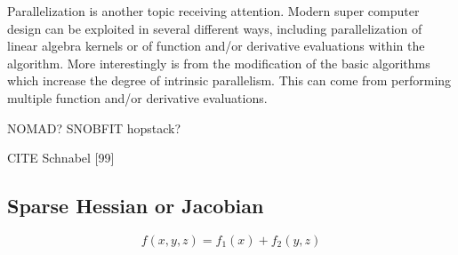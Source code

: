 \documentclass{article}
\begin{document}
Parallelization is another topic receiving attention.
Modern super computer design can be exploited in several different ways, including parallelization of linear algebra kernels or of function and/or derivative evaluations within the algorithm.
More interestingly is from the modification of the basic algorithms which increase the degree of intrinsic parallelism.
This can come from performing multiple function and/or derivative evaluations.


NOMAD?
SNOBFIT
hopstack?

CITE
Schnabel [99]




\subsection{Sparse Hessian or Jacobian}


\[
f(x, y, z) = f_1(x) + f_2(y,z)
\]






% 
% 
% 
% 
\end{document}
